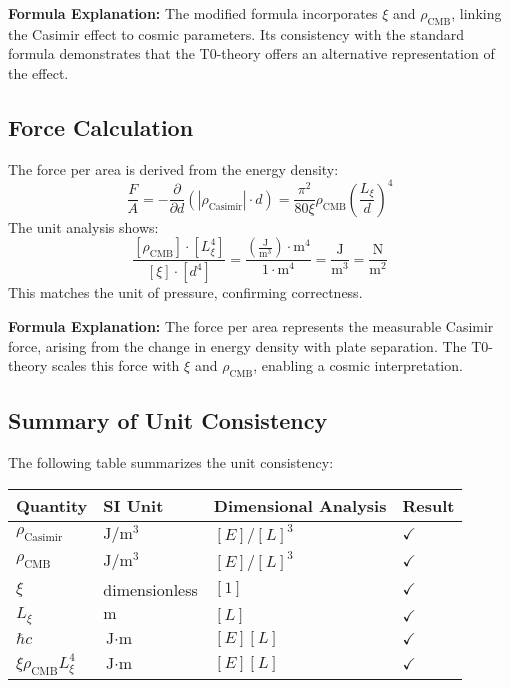 \documentclass{article}
\begin{document}
	\textbf{Formula Explanation:} The modified formula incorporates $\xi$ and $\rho_{\text{CMB}}$, linking the Casimir effect to cosmic parameters. Its consistency with the standard formula demonstrates that the T0-theory offers an alternative representation of the effect.
	
	\subsection{Force Calculation}
	The force per area is derived from the energy density:
	\begin{equation}
		\frac{F}{A} = -\frac{\partial}{\partial d} \left( |\rho_{\text{Casimir}}| \cdot d \right) = \frac{\pi^2}{80 \xi} \rho_{\text{CMB}} \left( \frac{L_\xi}{d} \right)^4
	\end{equation}
	The unit analysis shows:
	\begin{equation}
		\frac{[\rho_{\text{CMB}}] \cdot [L_\xi^4]}{[\xi] \cdot [d^4]} = \frac{\left( \frac{\text{J}}{\text{m}^3} \right) \cdot \text{m}^4}{1 \cdot \text{m}^4} = \frac{\text{J}}{\text{m}^3} = \frac{\text{N}}{\text{m}^2}
	\end{equation}
	This matches the unit of pressure, confirming correctness.
	
	\textbf{Formula Explanation:} The force per area represents the measurable Casimir force, arising from the change in energy density with plate separation. The T0-theory scales this force with $\xi$ and $\rho_{\text{CMB}}$, enabling a cosmic interpretation.
	
	\subsection{Summary of Unit Consistency}
	The following table summarizes the unit consistency:
	\begin{table}[h]
		\centering
		\begin{tabular}{l l l l}
			\toprule
			Quantity & SI Unit & Dimensional Analysis & Result \\
			\midrule
			$\rho_{\text{Casimir}}$ & $\text{J}/\text{m}^3$ & $[E]/[L]^3$ & $\checkmark$ \\
			$\rho_{\text{CMB}}$ & $\text{J}/\text{m}^3$ & $[E]/[L]^3$ & $\checkmark$ \\
			$\xi$ & dimensionless & $[1]$ & $\checkmark$ \\
			$L_\xi$ & $\text{m}$ & $[L]$ & $\checkmark$ \\
			$\hbar c$ & $\text{J} \cdot \text{m}$ & $[E][L]$ & $\checkmark$ \\
			$\xi \rho_{\text{CMB}} L_\xi^4$ & $\text{J} \cdot \text{m}$ & $[E][L]$ & $\checkmark$ \\
			\bottomrule
		\end{tabular}
	\end{table}
	
\end{document}
